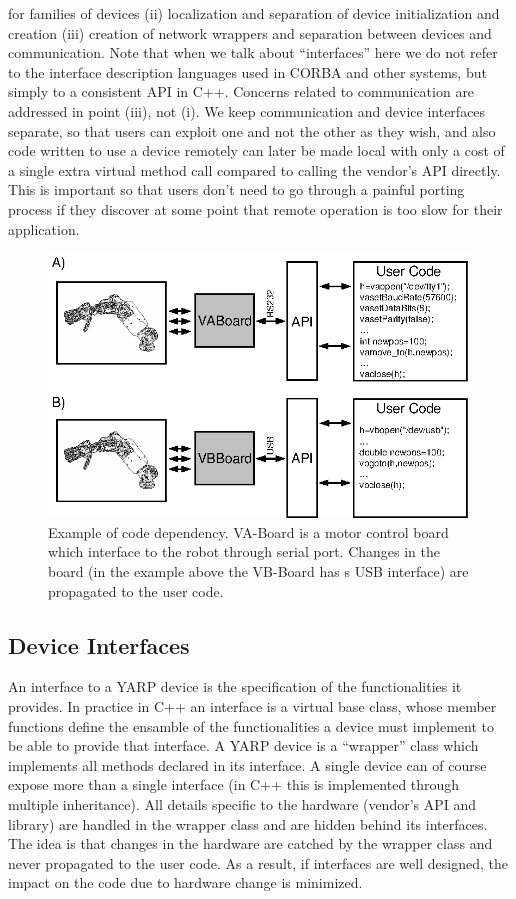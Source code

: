 for families of devices (ii) localization and separation of device 
initialization and creation (iii) creation of network wrappers and separation 
between devices and communication. 
%
Note that when we talk about ``interfaces'' here we do not refer to
the interface description languages used in CORBA and other systems,
but simply to a consistent API in C++.  Concerns related to
communication are addressed in point (iii), not (i).  We keep
communication and device interfaces separate, so that users can
exploit one and not the other as they wish, and also code written to
use a device remotely can later be made local with only a cost of a
single extra virtual method call compared to calling the vendor's API directly.
This is important so that users don't need to go through a painful
porting process if they discover at some point that remote operation
is too slow for their application.

\begin{figure}[tbp]
\centerline{
\includegraphics[width=24cm]{fig-devices1}
}
\caption{Example of code dependency. VA-Board is a 
motor control board which interface to the robot through serial port. 
Changes in the board (in the example above the VB-Board has s USB 
interface) are propagated to the user code.}\label{fig:devices1}
\end{figure}

\subsection{Device Interfaces}
An interface to a YARP device is the specification of the functionalities
it provides. In practice in C++ an interface is a virtual base class, whose 
member functions define the ensamble of the functionalities a device must 
implement to be able to provide that interface.  A YARP device is a 
``wrapper'' class which implements all methods declared in its interface. 
A single device can of course expose more than a single interface 
(in C++ this is implemented through multiple
inheritance). All details specific to the hardware 
(vendor's API and library) are handled in the wrapper class and are 
hidden behind its interfaces. 
The idea is that changes in the hardware are catched by the wrapper class 
and never propagated to the user code. As a result, if interfaces are 
well designed, the impact on the code due to hardware change is minimized. 

